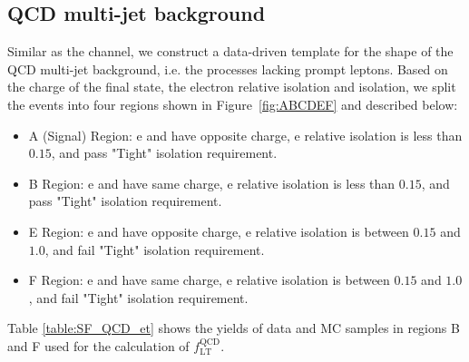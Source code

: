 \subsection{QCD multi-jet background}\label{sec:etau_qcd}
Similar as  the \tmth channel, we construct a data-driven template for
the shape of the QCD multi-jet background, i.e. the processes lacking
prompt leptons.  Based on the charge of the final state, the electron 
relative isolation and \tauh isolation, we split the events into 
four regions shown in Figure~\ref{fig:ABCDEF} and described below:
\begin{itemize}
  \item A (Signal) Region: e and \tauh have opposite charge, e relative isolation is less than $0.15$, and \tauh pass "Tight" isolation requirement.
  \item B Region: e and \tauh have same charge, e relative isolation is less than $0.15$, and \tauh pass "Tight" isolation requirement.
  \item E Region: e and \tauh have opposite charge, e relative isolation is between $0.15$ and $1.0$, and \tauh fail "Tight" isolation requirement.
  \item F Region: e and \tauh have same charge, e relative isolation is between $0.15$ and $1.0$, and \tauh fail "Tight" isolation requirement.
\end{itemize}

Table \ref{table:SF_QCD_et} shows the yields of data and MC samples in regions B 
and F used for the calculation of $f_\mathrm{LT}^\mathrm{QCD}$.

{\renewcommand{\arraystretch}{1.3}%
\begin{table}
   \caption{\label{table:SF_QCD_et} Event yields in regions B and F used for the calculation of $f_\mathrm{LT}^\mathrm{QCD}$.}
 \end{table}}

